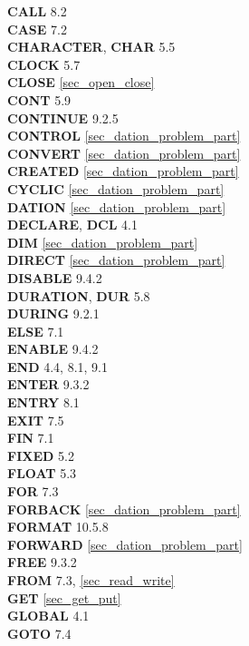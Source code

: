 {{{\bf CALL} 8.2\\
{\bf CASE} 7.2\\
{\bf CHARACTER}, {\bf CHAR} 5.5\\
{\bf CLOCK} 5.7\\
{\bf CLOSE} \ref{sec_open_close}\\
{\bf CONT} 5.9\\
{\bf CONTINUE} 9.2.5\\
{\bf CONTROL} \ref{sec_dation_problem_part}\\
{\bf CONVERT} \ref{sec_dation_problem_part}\\
{\bf CREATED} \ref{sec_dation_problem_part}\\
{\bf CYCLIC} \ref{sec_dation_problem_part}\\
 
{\bf DATION} \ref{sec_dation_problem_part}\\
{\bf DECLARE}, {\bf DCL} 4.1\\
{\bf DIM} \ref{sec_dation_problem_part}\\
{\bf DIRECT} \ref{sec_dation_problem_part}\\
{\bf DISABLE} 9.4.2\\
{\bf DURATION}, {\bf DUR} 5.8\\
{\bf DURING} 9.2.1\\

{\bf ELSE} 7.1\\
{\bf ENABLE} 9.4.2\\
{\bf END} 4.4, 8.1, 9.1\\
{\bf ENTER} 9.3.2\\
{\bf ENTRY} 8.1\\
{\bf EXIT} 7.5\\

{\bf FIN} 7.1\\
{\bf FIXED} 5.2\\
{\bf FLOAT} 5.3\\
{\bf FOR} 7.3\\
{\bf FORBACK} \ref{sec_dation_problem_part}\\
{\bf FORMAT} 10.5.8\\
{\bf FORWARD} \ref{sec_dation_problem_part}\\
{\bf FREE} 9.3.2\\
{\bf FROM} 7.3, \ref{sec_read_write}\\
 
{\bf GET} \ref{sec_get_put}\\
{\bf GLOBAL} 4.1\\
{\bf GOTO} 7.4\\
 
}}

